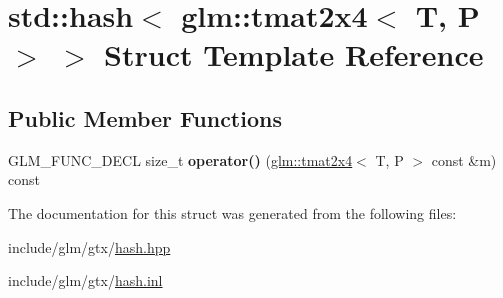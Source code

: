 \hypertarget{structstd_1_1hash_3_01glm_1_1tmat2x4_3_01T_00_01P_01_4_01_4}{}\section{std\+:\+:hash$<$ glm\+:\+:tmat2x4$<$ T, P $>$ $>$ Struct Template Reference}
\label{structstd_1_1hash_3_01glm_1_1tmat2x4_3_01T_00_01P_01_4_01_4}
\subsection*{Public Member Functions}
\begin{DoxyCompactItemize}
\item 
\mbox{\label{structstd_1_1hash_3_01glm_1_1tmat2x4_3_01T_00_01P_01_4_01_4_aa9d442a5d95414c0924492f564fad11a}} 
G\+L\+M\+\_\+\+F\+U\+N\+C\+\_\+\+D\+E\+CL size\+\_\+t {\bfseries operator()} (\hyperlink{structglm_1_1tmat2x4}{glm\+::tmat2x4}$<$ T, P $>$ const \&m) const
\end{DoxyCompactItemize}


The documentation for this struct was generated from the following files\+:\begin{DoxyCompactItemize}
\item 
include/glm/gtx/\hyperlink{hash_8hpp}{hash.\+hpp}\item 
include/glm/gtx/\hyperlink{hash_8inl}{hash.\+inl}\end{DoxyCompactItemize}
